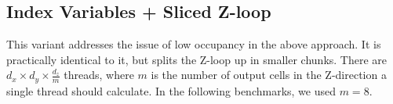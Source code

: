 \subsection{Index Variables + Sliced Z-loop} This variant addresses the issue of low occupancy in the above approach. It is practically identical to it, but splits the Z-loop up in smaller chunks. There are $d_x\times d_y\times \frac{d_z}{m}$ threads, where $m$ is the number of output cells in the Z-direction a single thread should calculate. In the following benchmarks, we used $m=8$.


